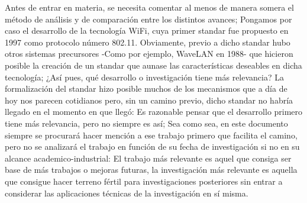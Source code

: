 Antes de entrar en materia, se necesita comentar al menos de manera somera el
método de análisis y de comparación entre los distintos avances; Pongamos por
caso el desarrollo de la tecnología WiFi, cuya primer standar fue propuesto en
1997 como protocolo número 802.11. Obviamente, previo a dicho standar hubo otros
sistemas precursores -Como por ejemplo, WaveLAN en 1988- que hicieron posible la
creación de un standar que aunase las características deseables en dicha
tecnología; ¿Así pues, qué desarrollo o investigación tiene más relevancia? La
formalización del standar hizo posible muchos de los mecanismos que a día de hoy
nos parecen cotidianos pero, sin un camino previo, dicho standar no habría
llegado en el momento en que llegó: Es razonable pensar que el desarrollo
primero tiene más relevancia, pero no siempre es así; Sea como sea, en este
documento siempre se procurará hacer mención a ese trabajo primero que facilita
el camino, pero no se analizará el trabajo en función de su fecha de
investigación si no en su alcance academico-industrial: El trabajo más relevante
es aquel que consiga ser base de más trabajos o mejoras futuras, la
investigación más relevante es aquella que consigue hacer terreno fértil para
investigaciones posteriores sin entrar a considerar las aplicaciones técnicas de
la investigación en sí misma.


